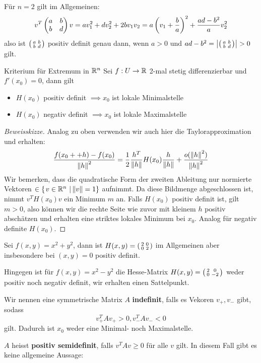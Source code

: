 \begin{example} Für $n=2$ gilt im Allgemeinen:
$$v^T \begin{pmatrix}a & b\\b&d\end{pmatrix}v = a v_1^2+dv_2^2+2bv_1v_2 = a\left(v_1 + \frac{b}{a}\right)^2 + \frac{ad-b^2}{a}v_2^2$$
also ist $\left(\begin{smallmatrix} a & b\\b & d \end{smallmatrix}\right)$ positiv definit genau dann, wenn $a > 0$ und $ad-b^2 = \left|\left(\begin{smallmatrix} a & b\\b & d \end{smallmatrix}\right)\right| > 0$ gilt.
\end{example}

\begin{satz}{Kriterium für Extremum in $\mathbb{R}^n$}{}
Sei $f: U \to \mathbb{R}$ 2-mal stetig differenzierbar und $f'(x_0)= 0$, dann gilt
\begin{itemize}
    \item $H(x_0)$ positiv definit $\implies x_0$ ist lokale Minimalstelle
    \item $H(x_0)$ negativ definit $\implies x_0$ ist lokale Maximalstelle
\end{itemize}
\end{satz}
\begin{proof}[Beweisskizze] Analog zu oben verwenden wir auch hier die Taylorapproximation und erhalten:
$$\frac{f(x_0++h)-f(x_0)}{\left\|h\right\|^2} = \frac{1}{2}\frac{h^T}{\left\|h\right\|} H(x_0) \frac{h}{\left\|h\right\|} + \frac{o(\left\|h\right\|^2)}{\left\|h\right\|^2}$$
Wir bemerken, dass die quadratische Form der zweiten Ableitung nur normierte Vektoren $\in \left\{\left.v \in \mathbb{R}^n \ \right| \left\|v\right\|=1 \right\}$ aufnimmt. Da diese Bildmenge abgeschlossen ist, nimmt $v^TH(x_0)v$ ein Minimum $m$ an. Falls $H(x_0)$ positiv definit ist, gilt $m > 0$, also können wir die rechte Seite wie zuvor mit kleinem $h$ positiv abschätzen und erhalten eine striktes lokales Minimum bei $x_0$. Analog für negativ definite $H(x_0)$.
\end{proof}
\begin{example}
Sei $f(x,y) = x^2 + y^2$, dann ist $H(x,y) = \left(\begin{smallmatrix} 2 & 0\\0 & 2 \end{smallmatrix}\right)$ im Allgemeinen aber insbesondere bei $(x,y) = 0$ positiv definit.

Hingegen ist für $f(x,y) = x^2 - y^2$ die Hesse-Matrix $H(x,y) = \left(\begin{smallmatrix} 2 & 0\\0 & -2 \end{smallmatrix}\right)$ weder positiv noch negativ definit, wir erhalten einen Sattelpunkt.
\end{example}
\begin{remark}
Wir nennen eine symmetrische Matrix $A$ \textbf{indefinit}, falls es Vekoren $v_{+}, v_-$ gibt, sodass
$$v_+^TAv_+ > 0, v_-^TAv_- <0$$
gilt. Dadurch ist $x_0$ weder eine Minimal- noch Maximalstelle.

$A$ heisst \textbf{positiv semidefinit}, falls $v^T A v \geq 0$ für alle $v$ gilt. In diesem Fall gibt es keine allgemeine Aussage:
\end{remark}
